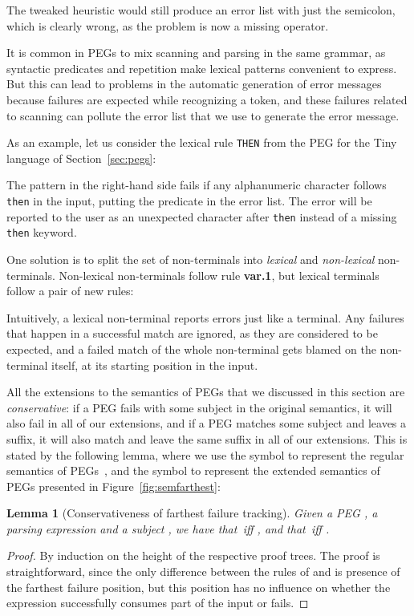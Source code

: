 \documentclass[3p,12pt,singlecolumn]{elsarticle}
\newtheorem{lemma}[proposition]{Lemma}
\begin{document}
The tweaked heuristic would still produce an error list
with just the semicolon, which is clearly wrong, as the
problem is now a missing operator.

It is common in PEGs to mix scanning and parsing in the
same grammar, as syntactic predicates and repetition make
lexical patterns convenient to express. But this can lead
to problems in the automatic generation of error messages
because failures are expected while recognizing a token,
and these failures related to scanning can pollute the
error list that we use to generate the error message.
 
As an example, let us consider the lexical rule {\tt THEN}
from the PEG for the Tiny language of Section~\ref{sec:pegs}:


The pattern in the right-hand side fails if any alphanumeric
character follows {\tt then} in the input, putting the
predicate in the error list. The error will be reported to
the user as an unexpected character after {\tt then}
instead of a missing {\tt then} keyword.

One solution is to split the set of non-terminals into
{\em lexical} and {\em non-lexical} non-terminals.
Non-lexical non-terminals follow rule {\bf var.1}, but
lexical terminals follow a pair of new rules:


Intuitively, a lexical non-terminal reports errors just like
a terminal. Any failures that happen in a successful match
are ignored, as they are considered to be expected, and a failed
match of the whole non-terminal gets blamed on the
non-terminal itself, at its starting position in the input.

All the extensions to the semantics of PEGs that we discussed
in this section are {\em conservative}: if a PEG fails with
some subject in the original semantics, it will also fail
in all of our extensions, and if a PEG matches some subject
and leaves a suffix, it will also match and leave the same
suffix in all of our extensions. This is stated by the
following lemma, where we use the symbol  to represent
the regular semantics of PEGs~\cite{mascarenhas2014}, and the symbol  to represent
the extended semantics of PEGs presented in Figure~\ref{fig:semfarthest}:
\begin{lemma}[Conservativeness of farthest failure tracking]
Given a PEG , a parsing expression  and a subject , we have that 
 \,iff\; ,
and that 
 \,iff\; .
\end{lemma}
\begin{proof}
By induction on the height of the respective proof trees. 
The proof is straightforward, since the only difference
between the rules of  and  is presence of
the farthest failure position, but this position has
no influence on whether the expression successfully
consumes part of the input or fails.
\end{proof}
\end{document}
